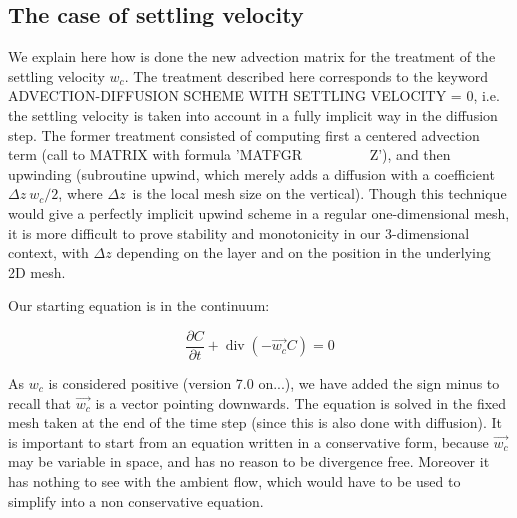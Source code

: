 %
%
%
%

\subsection{The case of settling velocity}

We explain here how is done the new advection matrix for the treatment of the
settling velocity $w_{c}$. The treatment described here corresponds to the
keyword ADVECTION-DIFFUSION SCHEME WITH SETTLING VELOCITY = 0, i.e. the
settling velocity is taken into account in a fully implicit way in the
diffusion step. The former treatment consisted of computing first a centered
advection term (call to MATRIX with formula 'MATFGR \ \ \ \ \ \ \ \ \ Z'), and
then upwinding (subroutine upwind, which merely adds a diffusion with a
coefficient $\Delta z~w_{c}/2$, where $\Delta z$\ is the local mesh
size on the vertical). Though this technique would give a perfectly implicit
upwind scheme in a regular one-dimensional mesh, it is more difficult to prove
stability and monotonicity in our 3-dimensional context, with $\Delta z $
depending on the layer and on the position in the underlying 2D mesh.

Our starting equation is in the continuum:%

\begin{equation}
\dfrac{\partial C}{\partial t}+\operatorname{div}(-\vec{w_{c}}C)=0
\end{equation}


As $w_{c}$ is considered positive (version 7.0 on...), we have added the sign
minus to recall that $\vec{w_{c}}$ is a vector pointing downwards.
The equation is solved in the fixed mesh taken at the end of the time step
(since this is also done with diffusion). It is important to start from an
equation written in a conservative form, because $\vec{w_{c}}$ may
be variable in space, and has no reason to be divergence free. Moreover it has
nothing to see with the ambient flow, which would have to be used to simplify
into a non conservative equation.

